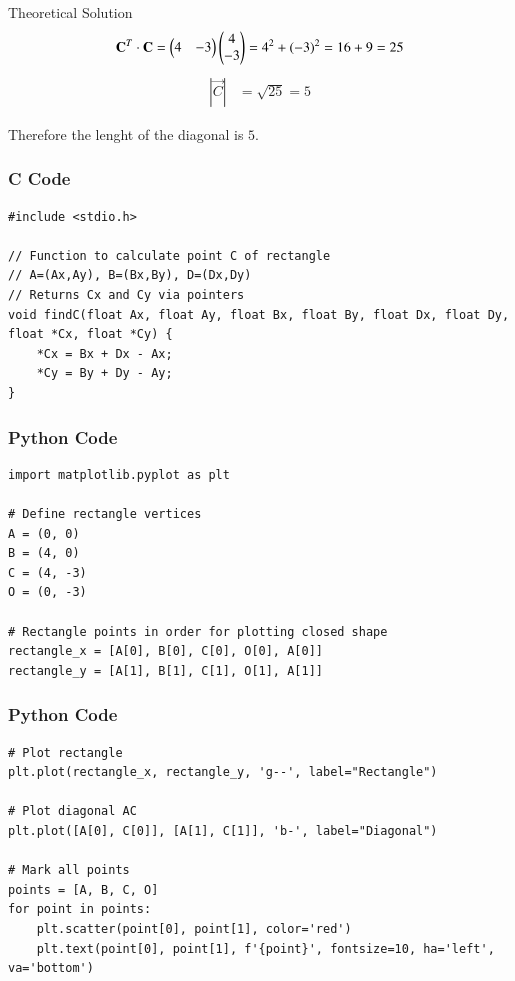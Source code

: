 \documentclass{beamer}
\begin{document}
\begin{frame}{Theoretical Solution}
\begin{align}
      \mathbf{C}^T \cdot \mathbf{C}=\begin{pmatrix}4 & -3\end{pmatrix}\begin{pmatrix}4 \\ -3\end{pmatrix} = 4^2 + (-3)^2 = 16 + 9 = 25
\end{align}
\begin{align}  
      \left|\vec{C}\right| &= \sqrt{25} = 5 
 \end{align}
 \begin{center}
Therefore the lenght of the diagonal is $5$.
 \end{center}
\end{frame}

\begin{frame}[fragile]
    \frametitle{C Code }

\begin{lstlisting}
#include <stdio.h>

// Function to calculate point C of rectangle
// A=(Ax,Ay), B=(Bx,By), D=(Dx,Dy)
// Returns Cx and Cy via pointers
void findC(float Ax, float Ay, float Bx, float By, float Dx, float Dy, float *Cx, float *Cy) {
    *Cx = Bx + Dx - Ax;
    *Cy = By + Dy - Ay;
}

\end{lstlisting}
\end{frame}

\begin{frame}[fragile]
    \frametitle{Python Code}
    \begin{lstlisting}
import matplotlib.pyplot as plt

# Define rectangle vertices
A = (0, 0)
B = (4, 0)
C = (4, -3)
O = (0, -3)

# Rectangle points in order for plotting closed shape
rectangle_x = [A[0], B[0], C[0], O[0], A[0]]
rectangle_y = [A[1], B[1], C[1], O[1], A[1]]

\end{lstlisting}
\end{frame}

\begin{frame}[fragile]
    \frametitle{Python Code}
    \begin{lstlisting}
# Plot rectangle
plt.plot(rectangle_x, rectangle_y, 'g--', label="Rectangle")

# Plot diagonal AC
plt.plot([A[0], C[0]], [A[1], C[1]], 'b-', label="Diagonal")

# Mark all points
points = [A, B, C, O]
for point in points:
    plt.scatter(point[0], point[1], color='red')
    plt.text(point[0], point[1], f'{point}', fontsize=10, ha='left', va='bottom')


\end{lstlisting}
\end{frame}
\end{document}
